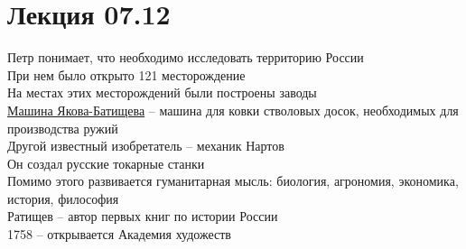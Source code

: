 \documentclass[12pt]{article}
\begin{document}
\section{Лекция 07.12}
Петр понимает, что необходимо исследовать территорию России\\
При нем было открыто 121 месторождение\\
На местах этих месторождений были построены заводы\\
\underline{Машина Якова-Батищева} -- машина для ковки стволовых досок, необходимых для производства ружий\\
Другой известный изобретатель -- механик Нартов\\
Он создал русские токарные станки\\
Помимо этого развивается гуманитарная мысль: биология, агрономия, экономика, история, философия\\
Ратищев -- автор первых книг по истории России\\
1758 -- открывается Академия художеств\\
\end{document}
